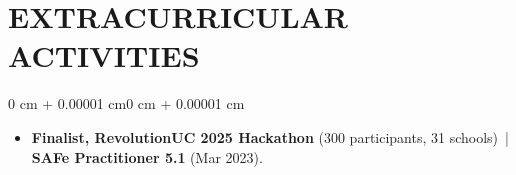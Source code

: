 \documentclass[10pt, letterpaper]{article}
\newenvironment{highlights}{
    \begin{itemize}[
        topsep=0.10 cm,
        parsep=0.06 cm,
        partopsep=0pt,
        itemsep=0.06 cm,
        leftmargin=12pt
    ]
}{
    \end{itemize}
}
\newenvironment{onecolentry}{
    \begin{adjustwidth}{0 cm + 0.00001 cm}{0 cm + 0.00001 cm}
}{
    \end{adjustwidth}
}
\begin{document}
\section{EXTRACURRICULAR ACTIVITIES}
\begin{onecolentry}
\begin{highlights}
  \item \textbf{Finalist, RevolutionUC 2025 Hackathon} (300 participants, 31 schools) \,|\, \textbf{SAFe Practitioner 5.1} (Mar 2023).
\end{highlights}
\end{onecolentry}
\end{document}
